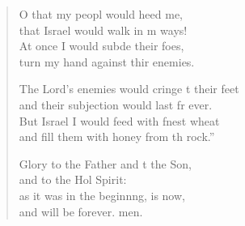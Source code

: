 \begin{verse}
\begin{patverse}
O that my peopl would heed me,\Med\\
that Israel would walk in m ways!\\
At once I would subde their foes,\Med\\
turn my hand against thir enemies.

The Lord’s enemies would cringe t their feet\Med\\
and their subjection would last fr ever.\\
But Israel I would feed with f\pointup{\i}nest wheat\Med\\
and fill them with honey from th rock.”

Glory to the Father and t the Son,\Med\\
and to the Hol Spirit:\\
as it was in the beginn\pointup{\i}ng, is now,\Med\\
and will be forever. men. 
  \end{patverse}
\end{verse}
